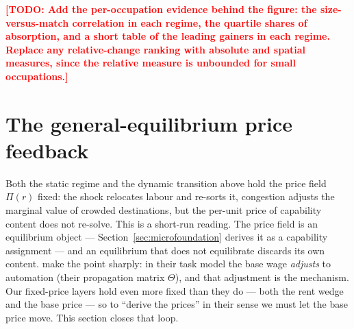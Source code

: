 \documentclass[12pt, a4paper]{article}
\newcommand{\todo}[1]{\textcolor{red}{\textbf{[TODO: #1]}}}
\begin{document}
\todo{Add the per-occupation evidence behind the figure: the
size-versus-match correlation in each regime, the quartile shares of
absorption, and a short table of the leading gainers in each regime.
Replace any relative-change ranking with absolute and spatial measures,
since the relative measure is unbounded for small occupations.}

\section{The general-equilibrium price feedback}
\label{sec:ge-feedback}

Both the static regime and the dynamic transition above hold the price field
$\Pi(r)$ fixed: the shock relocates labour and re-sorts it, congestion adjusts
the marginal value of crowded destinations, but the per-unit price of capability
content does not re-solve. This is a short-run reading. The price field is an
equilibrium object --- Section~\ref{sec:microfoundation} derives it as a
capability assignment --- and an equilibrium that does not equilibrate discards
its own content. \textcite{acemoglu2024rents} make the point sharply: in their
task model the base wage \emph{adjusts} to automation (their propagation matrix
$\Theta$), and that adjustment is the mechanism. Our fixed-price layers hold even
more fixed than they do --- both the rent wedge and the base price --- so to
``derive the prices'' in their sense we must let the base price move. This
section closes that loop.
\end{document}
